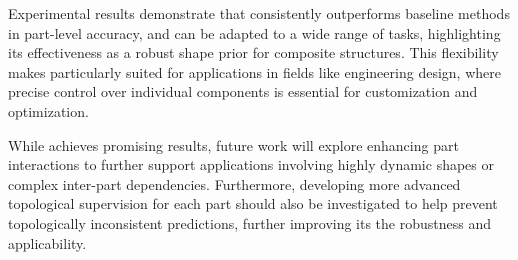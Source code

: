 Experimental results demonstrate that \PSDF{} consistently outperforms baseline methods in part-level accuracy, and can be adapted to a wide range of tasks, highlighting its effectiveness as a robust shape prior for composite structures. This flexibility makes \PSDF{} particularly suited for applications in fields like engineering design, where precise control over individual components is essential for customization and optimization.

While \PSDF{} achieves promising results, future work will  explore enhancing part interactions to further support applications involving highly dynamic shapes or complex inter-part dependencies. Furthermore, developing more advanced topological supervision for each part should also be investigated to help prevent topologically inconsistent predictions, further improving its the robustness and applicability.

